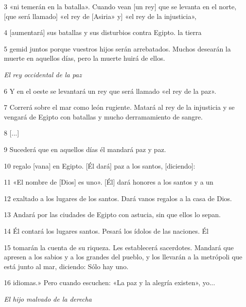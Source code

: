 \par 3 «ni temerán en la batalla». Cuando vean [un rey] que se levanta en el norte, [que será llamado] «el rey de [Asiria» y] «el rey de la injusticia»,

\par 4 [aumentará] sus batallas y sus disturbios contra Egipto. la tierra

\par 5 gemid juntos porque vuestros hijos serán arrebatados. Muchos desearán la muerte en aquellos días, pero la muerte huirá de ellos.

\par \textit{El rey occidental de la paz}

\par 6 Y en el oeste se levantará un rey que será llamado «el rey de la paz».

\par 7 Correrá sobre el mar como león rugiente. Matará al rey de la injusticia y se vengará de Egipto con batallas y mucho derramamiento de sangre.

\par 8 [...]

\par 9 Sucederá que en aquellos días él mandará paz y paz.

\par 10 regalo [vana] en Egipto. [Él dará] paz a los santos, [diciendo]:

\par 11 «El nombre de [Dios] es uno». [Él] dará honores a los santos y a un

\par 12 exaltado a los lugares de los santos. Dará vanos regalos a la casa de Dios.

\par 13 Andará por las ciudades de Egipto con astucia, sin que ellos lo sepan.

\par 14 Él contará los lugares santos. Pesará los ídolos de las naciones. Él

\par 15 tomarán la cuenta de su riqueza. Les establecerá sacerdotes. Mandará que apresen a los sabios y a los grandes del pueblo, y los llevarán a la metrópoli que está junto al mar, diciendo: Sólo hay uno.

\par 16 idiomas.» Pero cuando escuchen: «La paz y la alegría existen», yo...

\par \textit{El hijo malvado de la derecha}

